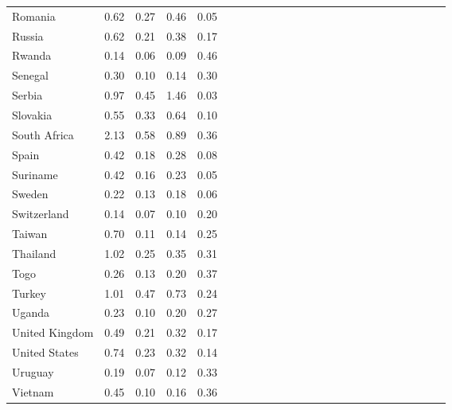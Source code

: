 \begin{ThreePartTable}
\begin{longtable}[t]{l|r|rrrl|r|rrrl|r|rrrl|r|rrrl|r|rrr}
Romania & 0.62 & 0.27 & 0.46 & 0.05\\
Russia & 0.62 & 0.21 & 0.38 & 0.17\\
Rwanda & 0.14 & 0.06 & 0.09 & 0.46\\
Senegal & 0.30 & 0.10 & 0.14 & 0.30\\
Serbia & 0.97 & 0.45 & 1.46 & 0.03\\
Slovakia & 0.55 & 0.33 & 0.64 & 0.10\\
South Africa & 2.13 & 0.58 & 0.89 & 0.36\\
Spain & 0.42 & 0.18 & 0.28 & 0.08\\
Suriname & 0.42 & 0.16 & 0.23 & 0.05\\
Sweden & 0.22 & 0.13 & 0.18 & 0.06\\
Switzerland & 0.14 & 0.07 & 0.10 & 0.20\\
Taiwan & 0.70 & 0.11 & 0.14 & 0.25\\
Thailand & 1.02 & 0.25 & 0.35 & 0.31\\
Togo & 0.26 & 0.13 & 0.20 & 0.37\\
Turkey & 1.01 & 0.47 & 0.73 & 0.24\\
Uganda & 0.23 & 0.10 & 0.20 & 0.27\\
United Kingdom & 0.49 & 0.21 & 0.32 & 0.17\\
United States & 0.74 & 0.23 & 0.32 & 0.14\\
Uruguay & 0.19 & 0.07 & 0.12 & 0.33\\
Vietnam & 0.45 & 0.10 & 0.16 & 0.36\\*
\end{longtable}
\end{ThreePartTable}
\endgroup{}
